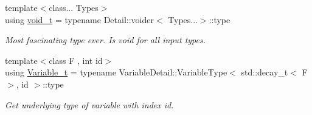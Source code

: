 \begin{DoxyCompactItemize}
{\footnotesize template$<$class... Types$>$ }\\using \hyperlink{namespaceFunG_a0cde667596590eb8d32e4a5ee76ddbb9}{void\-\_\-t} = typename Detail\-::voider$<$ Types...$>$\-::type
\begin{DoxyCompactList}\small\item\em Most fascinating type ever. Is void for all input types. \end{DoxyCompactList}\item 
{\footnotesize template$<$class F , int id$>$ }\\using \hyperlink{namespaceFunG_a1c6fc5c4c7cd6678b9de8962c14b86b5}{Variable\-\_\-t} = typename Variable\-Detail\-::\-Variable\-Type$<$ std\-::decay\-\_\-t$<$ F $>$, id $>$\-::type
\begin{DoxyCompactList}\small\item\em Get underlying type of variable with index id. \end{DoxyCompactList}\end{DoxyCompactItemize}
